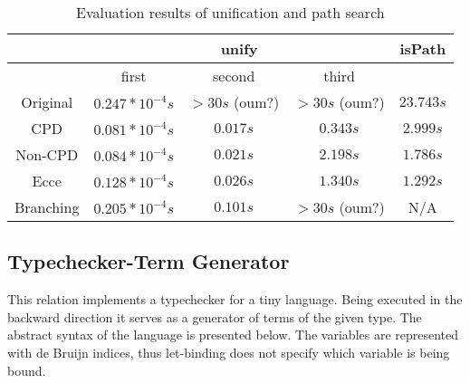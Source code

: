\begin{table}
  \centering
  \begin{tabular}{c||c|c|c||c}
                   & \multicolumn{3}{c||}{unify} & isPath \\
  \hline
                   & first  & second & third     &        \\
  \hline\hline
  Original         & $0.247*10^{-4}s$ & $>30s$ (oum?) & $>30s$ (oum?) & $23.743s$ \\
  \hline
  CPD              & $0.081*10^{-4}s$ & $0.017s$ & $0.343s$  & $2.999s$  \\
  \hline
  Non-CPD          & $0.084*10^{-4}s$ & $0.021s$ & $2.198s$  & $1.786s$  \\
  \hline
  Ecce             & $0.128*10^{-4}s$ & $0.026s$ & $1.340s$  & $1.292s$ \\
  \hline
  Branching        & $0.205*10^{-4}s$ & $0.101s$ & $>30s$ (oum?) & N/A \\
  \hline
  \end{tabular}

  \caption{Evaluation results of unification and path search}
  \label{tbl:unify}
\end{table}

\subsection{Typechecker-Term Generator}

This relation implements a typechecker for a tiny language.
Being executed in the backward direction it serves as a generator of terms of the given type.
The abstract syntax of the language is presented below.
The variables are represented with de Bruijn indices, thus let-binding does not specify which variable is being bound.



